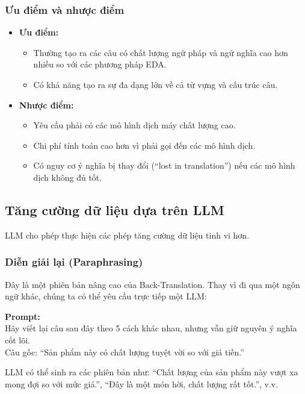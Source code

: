 \subsubsection{Ưu điểm và nhược điểm}
\begin{itemize}
    \item \textbf{Ưu điểm:}
        \begin{itemize}
            \item Thường tạo ra các câu có chất lượng ngữ pháp và ngữ nghĩa cao hơn nhiều so với các phương pháp EDA.
            \item Có khả năng tạo ra sự đa dạng lớn về cả từ vựng và cấu trúc câu.
        \end{itemize}
    \item \textbf{Nhược điểm:}
        \begin{itemize}
            \item Yêu cầu phải có các mô hình dịch máy chất lượng cao.
            \item Chi phí tính toán cao hơn vì phải gọi đến các mô hình dịch.
            \item Có nguy cơ ý nghĩa bị thay đổi (“lost in translation”) nếu các mô hình dịch không đủ tốt.
        \end{itemize}
\end{itemize}

\subsection{Tăng cường dữ liệu dựa trên LLM}
\label{ssec:llm_based_augmentation}
LLM cho phép thực hiện các phép tăng cường dữ liệu tinh vi hơn.

\subsubsection{Diễn giải lại (Paraphrasing)}
Đây là một phiên bản nâng cao của Back-Translation. Thay vì đi qua một ngôn ngữ khác, chúng ta có thể yêu cầu trực tiếp một LLM:
\begin{promptbox}
\textbf{Prompt:} \\
Hãy viết lại câu sau đây theo 5 cách khác nhau, nhưng vẫn giữ nguyên ý nghĩa cốt lõi. \\
Câu gốc: “Sản phẩm này có chất lượng tuyệt vời so với giá tiền.”
\end{promptbox}
LLM có thể sinh ra các phiên bản như: “Chất lượng của sản phẩm này vượt xa mong đợi so với mức giá.”, “Đây là một món hời, chất lượng rất tốt.”, v.v.

